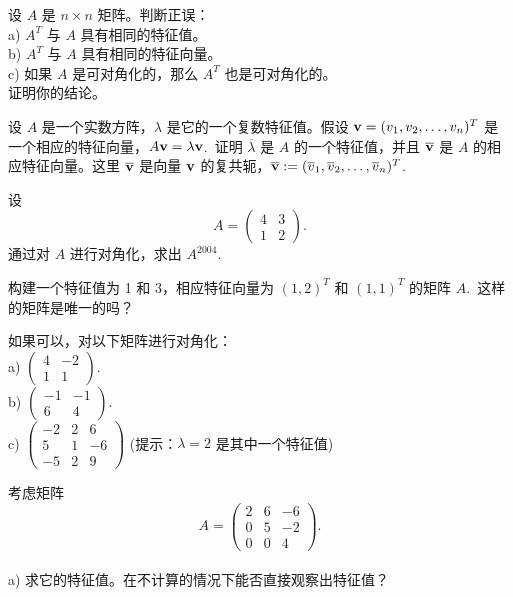 \begin{problemset}
\item \label{ex:04-02-01} 设 $A$ 是 $n \times n$ 矩阵。判断正误：
\\
a) $A^T$ 与 $A$ 具有相同的特征值。
\\
b) $A^T$ 与 $A$ 具有相同的特征向量。
\\
c) 如果 $A$ 是可对角化的，那么 $A^T$ 也是可对角化的。
\\
证明你的结论。
\item \label{ex:04-02-02} 设 $A$ 是一个实数方阵，$\lambda$ 是它的一个复数特征值。假设 $\mathbf{v} = (v_1, v_2, \dots, v_n)^T$ 是一个相应的特征向量，$A\mathbf{v} = \lambda \mathbf{v}$.~证明 $\overline{\lambda}$ 是 $A$ 的一个特征值，并且 $\overline{\mathbf{v}}$ 是 $A$ 的相应特征向量。这里 $\overline{\mathbf{v}}$ 是向量 $\mathbf{v}$ 的复共轭，$\overline{\mathbf{v}} := (\overline{v}_1, \overline{v}_2, \dots, \overline{v}_n)^T$.~
\item \label{ex:04-02-03} 设
$$A = \begin{pmatrix} 4 & 3 \\ 1 & 2 \end{pmatrix}.$$
通过对 $A$ 进行对角化，求出 $A^{2004}$.~
\item \label{ex:04-02-04} 构建一个特征值为 1 和 3，相应特征向量为 $(1, 2)^T$ 和 $(1, 1)^T$ 的矩阵 $A$.~这样的矩阵是唯一的吗？
\item \label{ex:04-02-05} 如果可以，对以下矩阵进行对角化：
\\
a) $\begin{pmatrix} 4 & -2 \\ 1 & 1 \end{pmatrix}.$
\\
b) $\begin{pmatrix} -1 & -1 \\ 6 & 4 \end{pmatrix}.$
\\
c) $\begin{pmatrix} -2 & 2 & 6 \\ 5 & 1 & -6 \\ -5 & 2 & 9 \end{pmatrix}$ (提示：$\lambda = 2$ 是其中一个特征值)
\item \label{ex:04-02-06} 考虑矩阵
$$A = \begin{pmatrix} 2 & 6 & -6 \\ 0 & 5 & -2 \\ 0 & 0 & 4 \end{pmatrix}.$$
\\
a) 求它的特征值。在不计算的情况下能否直接观察出特征值？

\end{problemset}
